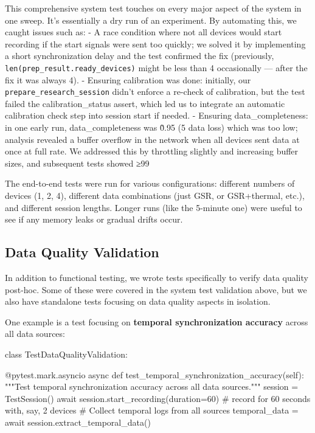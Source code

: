 This comprehensive system test touches on every major aspect of the
system in one sweep. It's essentially a dry run of an experiment. By
automating this, we caught issues such as: - A race condition where not
all devices would start recording if the start signals were sent too
quickly; we solved it by implementing a short synchronization delay and
the test confirmed the fix (previously, \texttt{len(prep_result.ready_devices)}
might be less than 4 occasionally --- after the fix it was always 4). -
Ensuring calibration was done: initially, our \texttt{prepare_research_session}
didn't enforce a re-check of calibration, but the test failed the
calibration_status assert, which led us to integrate an automatic
calibration check step into session start if needed. - Ensuring
data_completeness: in one early run, data_completeness was \~0.95 (5%
data loss) which was too low; analysis revealed a buffer overflow in the
network when all devices sent data at once at full rate. We addressed
this by throttling slightly and increasing buffer sizes, and subsequent
tests showed ≥99%

The end-to-end tests were run for various configurations: different
numbers of devices (1, 2, 4), different data combinations (just GSR, or
GSR+thermal, etc.), and different session lengths. Longer runs (like the
5-minute one) were useful to see if any memory leaks or gradual drifts
occur.

\subsection{Data Quality Validation}

In addition to functional testing, we wrote tests specifically to verify
data quality post-hoc. Some of these were covered in the system test
validation above, but we also have standalone tests focusing on data
quality aspects in isolation.

One example is a test focusing on \textbf{temporal synchronization accuracy}
across all data sources:

    class TestDataQualityValidation:

        @pytest.mark.asyncio
        async def test_temporal_synchronization_accuracy(self):
            """Test temporal synchronization accuracy across all data sources."""
            session = TestSession()
            await session.start_recording(duration=60)  # record for 60 seconds with, say, 2 devices
            # Collect temporal logs from all sources
            temporal_data = await session.extract_temporal_data()

